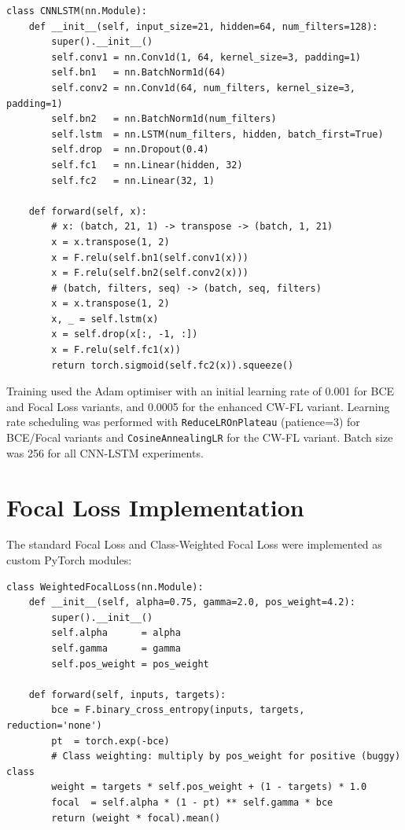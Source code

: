 \documentclass[12pt,a4paper,oneside]{report}
\begin{document}
\begin{lstlisting}[caption={CNN-LSTM Model Definition (PyTorch)}, label={lst:cnnlstm}]
class CNNLSTM(nn.Module):
    def __init__(self, input_size=21, hidden=64, num_filters=128):
        super().__init__()
        self.conv1 = nn.Conv1d(1, 64, kernel_size=3, padding=1)
        self.bn1   = nn.BatchNorm1d(64)
        self.conv2 = nn.Conv1d(64, num_filters, kernel_size=3, padding=1)
        self.bn2   = nn.BatchNorm1d(num_filters)
        self.lstm  = nn.LSTM(num_filters, hidden, batch_first=True)
        self.drop  = nn.Dropout(0.4)
        self.fc1   = nn.Linear(hidden, 32)
        self.fc2   = nn.Linear(32, 1)

    def forward(self, x):
        # x: (batch, 21, 1) -> transpose -> (batch, 1, 21)
        x = x.transpose(1, 2)
        x = F.relu(self.bn1(self.conv1(x)))
        x = F.relu(self.bn2(self.conv2(x)))
        # (batch, filters, seq) -> (batch, seq, filters)
        x = x.transpose(1, 2)
        x, _ = self.lstm(x)
        x = self.drop(x[:, -1, :])
        x = F.relu(self.fc1(x))
        return torch.sigmoid(self.fc2(x)).squeeze()
\end{lstlisting}

Training used the Adam optimiser with an initial learning rate of 0.001 for BCE and Focal Loss variants, and 0.0005 for the enhanced CW-FL variant. Learning rate scheduling was performed with \texttt{ReduceLROnPlateau} (patience=3) for BCE/Focal variants and \texttt{CosineAnnealingLR} for the CW-FL variant. Batch size was 256 for all CNN-LSTM experiments.

\section{Focal Loss Implementation}

The standard Focal Loss and Class-Weighted Focal Loss were implemented as custom PyTorch modules:

\begin{lstlisting}[caption={Class-Weighted Focal Loss Implementation}, label={lst:cwfl}]
class WeightedFocalLoss(nn.Module):
    def __init__(self, alpha=0.75, gamma=2.0, pos_weight=4.2):
        super().__init__()
        self.alpha      = alpha
        self.gamma      = gamma
        self.pos_weight = pos_weight

    def forward(self, inputs, targets):
        bce = F.binary_cross_entropy(inputs, targets, reduction='none')
        pt  = torch.exp(-bce)
        # Class weighting: multiply by pos_weight for positive (buggy) class
        weight = targets * self.pos_weight + (1 - targets) * 1.0
        focal  = self.alpha * (1 - pt) ** self.gamma * bce
        return (weight * focal).mean()
\end{lstlisting}
\end{document}
